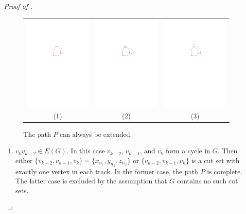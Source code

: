 \documentclass{patmorin}
\begin{document}
\begin{proof}[Proof of ]
\begin{figure}
   \begin{center}
     \begin{tabular}{ccc}
       \includegraphics[width=0.3\columnwidth]{figs/sloppy-1} &
       \includegraphics[width=0.3\columnwidth]{figs/sloppy-2} &
       \includegraphics[width=0.3\columnwidth]{figs/sloppy-3} \\
       (1) & (2) & (3)
     \end{tabular}
   \end{center}
   \caption{The path $P$ can always be extended.}
\end{figure}


  \begin{enumerate}
  \item $v_k v_{k-2}\in E(G)$.  In this
  case $v_{k-2}$, $v_{k-1}$, and $v_k$ form a cycle in $G$.  Then either
  $\{v_{k-2},v_{k-1},v_{k}\}=\{x_{n_1},y_{n_2},z_{n_3}\}$ or
  $\{v_{k-2},v_{k-1},v_{k}\}$ is a cut set with exactly one vertex in
  each track.  In the former case, the path $P$ is complete. The latter case is  excluded by the assumption that $G$ contains no such cut sets.


\end{enumerate}
\end{proof}
\end{document}
